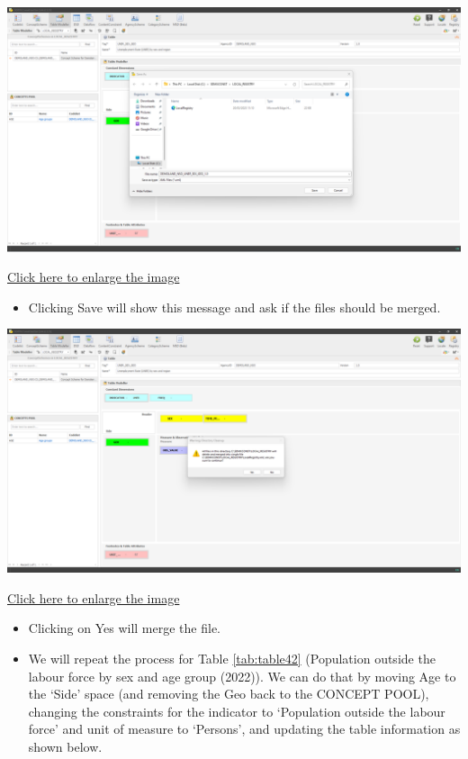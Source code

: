 \documentclass[
]{book}
\providecommand{\tightlist}{%
  \setlength{\itemsep}{0pt}\setlength{\parskip}{0pt}}
\begin{document}
\begin{center}\includegraphics[width=1\linewidth]{./images/image152} \end{center}

\href{images/image152.png}{Click here to enlarge the image}

\begin{itemize}
\tightlist
\item
  Clicking Save will show this message and ask if the files should be merged.
\end{itemize}

\begin{center}\includegraphics[width=1\linewidth]{./images/image154} \end{center}

\href{images/image154.png}{Click here to enlarge the image}

\begin{itemize}
\tightlist
\item
  Clicking on Yes will merge the file.
\item
  We will repeat the process for Table \ref{tab:table42} (Population outside the labour force by sex and age group (2022)). We can do that by moving Age to the `Side' space (and removing the Geo back to the CONCEPT POOL), changing the constraints for the indicator to `Population outside the labour force' and unit of measure to `Persons', and updating the table information as shown below.
\end{itemize}
\end{document}
